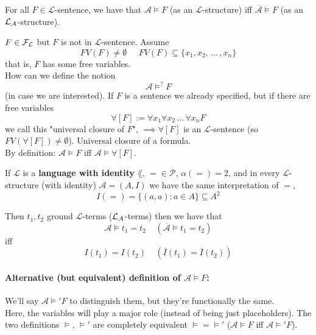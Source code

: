 For all $F \in \mathcal{L}$-sentence, we have that $\mathcal{A} \models F$ (as an $\mathcal{L}$-structure) iff $\overline{\mathcal{A}} \models F$ (as an $\mathcal{L}_\mathcal{A}$-structure).\\

\begin{remark}
	$F \in \mathcal{F}_\mathcal{L}$ but $F$ is not in $\mathcal{L}$-sentence. Assume
	$$ FV(F) \neq \emptyset \;\;\;\;\; FV(F) \subseteq \{x_1, x_2, \, \dots \, , x_n\} $$
	that is, $F$ has some free variables.\\
	
	How can we define the notion
	$$ \mathcal{A} \models^? F $$
	(in case we are interested). If $F$ is a sentence we already specified, but if there are free variables 
	$$ \forall [F] := \forall x_1 \forall x_2 \, \dots \, \forall x_n F$$
	we call this "universal closure of $F$", $\implies \forall [F]$ is an $\mathcal{L}$-sentence (so $FV(\forall[F]) \neq \emptyset$). Universal closure of a formula.\\
	By definition: $\mathcal A \models F$ iff $\mathcal A \models \forall [F]$.\\
\end{remark}

\begin{remark}
	If $\mathcal{L}$ is a \textbf{language with identity} $\lang$, $= \in \mathcal{P}$, $\alpha(=) = 2$, and in every $\mathcal{L}$-structure (with identity) $\mathcal{A} = (A,I)$ we have the same interpretation of $=$, 
	$$ I(=) = \{(a,a): a \in A\} \subseteq A^2 $$
	
	Then $t_1, t_2$ ground $\mathcal{L}$-terms ($\mathcal{L}_\mathcal{A}$-terms) then we have that 
	$$ \mathcal{A} \models t_1 = t_2 \;\;\;\; (\overline{\mathcal{A}} \models t_1 = t_2) $$
	iff
	$$ I(t_1) = I(t_2) \;\;\;\; (\overline I (t_1) = \overline I (t_2)) $$
\end{remark}


\paragraph{Alternative (but equivalent) definition of $\mathcal{A} \models F$:} We'll say $\mathcal{A} \models' F$ to distinguish them, but they're functionally the same.\\

Here, the variables will play a major role (instead of being just placeholders). The two definitions $\models$, $\models'$ are completely equivalent $\models = \models'$ ($\mathcal{A} \models F$ iff $\mathcal{A} \models' F$).\\

